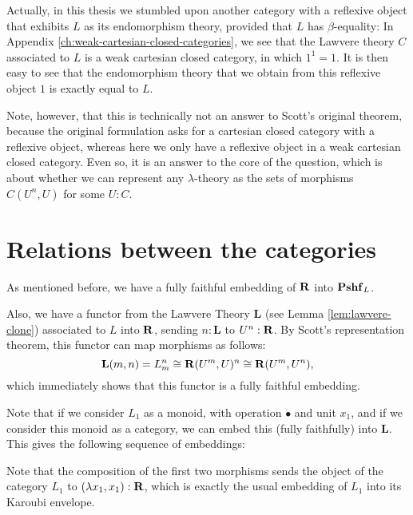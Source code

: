 \begin{remark}
  Actually, in this thesis we stumbled upon another category with a reflexive object that exhibits $ L $ as its endomorphism theory, provided that $ L $ has $ \beta $-equality: In Appendix \ref{ch:weak-cartesian-closed-categories}, we see that the Lawvere theory $ C $ associated to $ L $ is a weak cartesian closed category, in which $ 1^1 = 1 $. It is then easy to see that the endomorphism theory that we obtain from this reflexive object $ 1 $ is exactly equal to $ L $.

  Note, however, that this is technically not an answer to Scott's original theorem, because the original formulation asks for a cartesian closed category with a reflexive object, whereas here we only have a reflexive object in a weak cartesian closed category. Even so, it is an answer to the core of the question, which is about whether we can represent any $ \lambda $-theory as the sets of morphisms $ C(U^n, U) $ for some $ U : C $.
\end{remark}

\section{Relations between the categories}

As mentioned before, we have a fully faithful embedding of $ \mathbf{R} $ into $ \mathbf{Pshf}_{L} $.

Also, we have a functor from the Lawvere Theory $ \mathbf{L} $ (see Lemma \ref{lem:lawvere-clone}) associated to $ L $ into $ \mathbf{R} $, sending $ n : \mathbf L $ to $ U^n : \mathbf{R} $. By Scott's representation theorem, this functor can map morphisms as follows:
\[ \mathbf L(m, n) = L_m^n \cong \mathbf{R}(U^m, U)^n \cong \mathbf{R}(U^m, U^n), \]
which immediately shows that this functor is a fully faithful embedding.

Note that if we consider $ L_1 $ as a monoid, with operation $ \bullet $ and unit $ x_1 $, and if we consider this monoid as a category, we can embed this (fully faithfully) into $ \mathbf L $. This gives the following sequence of embeddings:
\begin{center}
\end{center}

Note that the composition of the first two morphisms sends the object of the category $ L_1 $ to $ (\lambda x_1, x_1) : \mathbf{R} $, which is exactly the usual embedding of $ L_1 $ into its Karoubi envelope.

